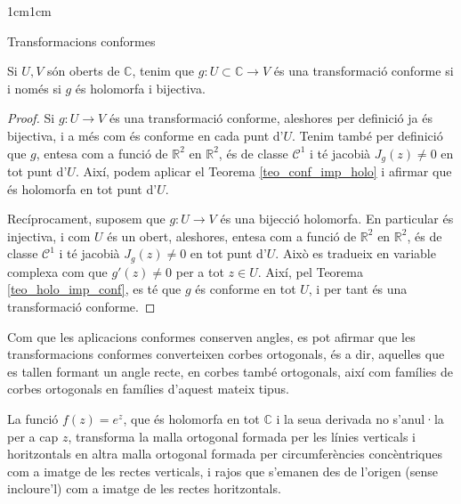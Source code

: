 \begin{adjustwidth}{1cm}{1cm}
\begin{subsection}{Transformacions conformes}
    \begin{corolari}
        Si $U,V$ són oberts de $\mathbb{C}$, tenim que $g:U\subset \mathbb{C}\to V$ és una transformació conforme si i només si $g$ és holomorfa i bijectiva.
        \label{tc_sii_holo_i_bij}
    \end{corolari}

    \begin{proof}
        Si $g:U\to V$ és una transformació conforme, aleshores per definició ja és bijectiva, i a més com és conforme en cada punt d'$U$. Tenim també per definició que $g$, entesa com a funció de $\mathbb{R}^2$ en $\mathbb{R}^2$, és de classe $\mathcal{C}^1$ i té jacobià $J_g(z)\neq 0$ en tot punt d'$U$. Així, podem aplicar el Teorema \ref{teo_conf_imp_holo} i afirmar que és holomorfa en tot punt d'$U$.

        Recíprocament, suposem que $g:U\to V$ és una bijecció holomorfa. En particular és injectiva, i com $U$ és un obert, aleshores, entesa com a funció de $\mathbb{R}^2$ en $\mathbb{R}^2$, és de classe $\mathcal{C}^1$ i té jacobià $J_g(z)\neq 0$ en tot punt d'$U$. Això es tradueix en variable complexa com que $g'(z)\neq 0$ per a tot $z\in U$. Així, pel Teorema \ref{teo_holo_imp_conf}, es té que $g$ és conforme en tot $U$, i per tant és una transformació conforme.
    \end{proof}

    Com que les aplicacions conformes conserven angles, es pot afirmar que les transformacions conformes converteixen corbes ortogonals, és a dir, aquelles que es tallen formant un angle recte, en corbes també ortogonals, així com famílies de corbes ortogonals en famílies d'aquest mateix tipus. 

    \begin{exemple}
        La funció $f(z)=e^z$, que és holomorfa en tot $\mathbb{C}$ i la seua derivada no s'anul·la per a cap $z$, transforma la malla ortogonal formada per les línies verticals i horitzontals en altra malla ortogonal formada per circumferències concèntriques com a imatge de les rectes verticals, i rajos que s'emanen des de l'origen (sense incloure'l) com a imatge de les rectes horitzontals.
    \end{exemple}


\end{subsection}
\end{adjustwidth}
